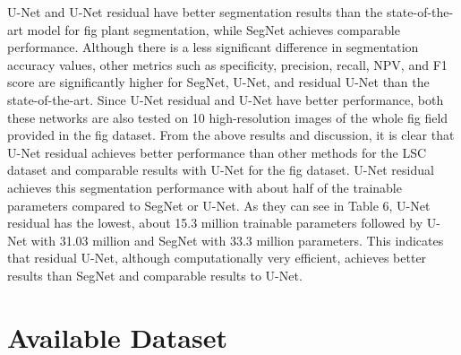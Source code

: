 U-Net and U-Net residual have better segmentation results than the state-of-the-art model for fig plant segmentation, while SegNet achieves comparable performance.
Although there is a less significant difference in segmentation accuracy values, other metrics such as specificity, precision, recall, NPV, and F1 score are significantly
higher for SegNet, U-Net, and residual U-Net than the state-of-the-art. Since U-Net residual and U-Net have better performance, both these networks are also tested on
10 high-resolution images of the whole fig field provided in the fig dataset. From the above results and discussion, it is clear that U-Net residual achieves better
performance than other methods for the LSC dataset and comparable results with U-Net for the fig dataset. U-Net residual achieves this segmentation performance with
about half of the trainable parameters compared to SegNet or U-Net. As they can see in Table 6, U-Net residual has the lowest, about 15.3 million trainable parameters
followed by U-Net with 31.03 million and SegNet with 33.3 million parameters. This indicates that residual U-Net, although computationally very efficient, achieves
better results than SegNet and comparable results to U-Net. 


\section{Available Dataset}

